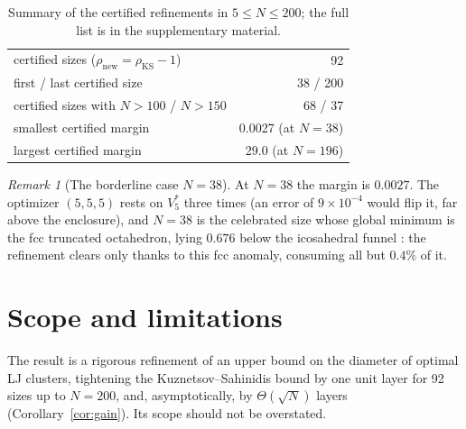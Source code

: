 \documentclass[11pt]{article}
\theoremstyle{remark}
\newtheorem{remark}{Remark}
\newcommand{\KS}{\mathrm{KS}}
\begin{document}
\begin{table}[t]
\centering
\caption{Summary of the certified refinements in $5\le N\le200$; the full list is in the supplementary material.}\label{tab:summary}
\begin{tabular}{lr}
\toprule
certified sizes ($\rho_{\mathrm{new}}=\rho_\KS-1$) & 92\\
first / last certified size & 38 / 200\\
certified sizes with $N>100$ / $N>150$ & 68 / 37\\
smallest certified margin & 0.0027 (at $N=38$)\\
largest certified margin & 29.0 (at $N=196$)\\
\bottomrule
\end{tabular}
\end{table}

\begin{remark}[The borderline case $N=38$]\label{rem:38}
At $N=38$ the margin is $0.0027$. The optimizer $(5,5,5)$ rests on $V^*_5$ three times (an error of $9\times10^{-4}$ would flip it, far above the enclosure), and $N=38$ is the celebrated size whose global minimum is the fcc truncated octahedron, lying $0.676$ below the icosahedral funnel \cite{doye1999}: the refinement clears only thanks to this fcc anomaly, consuming all but $0.4\%$ of it.
\end{remark}

\section{Scope and limitations}\label{sec:scope}

The result is a rigorous refinement of an upper bound on the diameter of optimal LJ clusters, tightening the Kuznetsov--Sahinidis bound \cite{ks2025} by one unit layer for 92 sizes up to $N=200$, and, asymptotically, by $\Theta(\sqrt N)$ layers (Corollary~\ref{cor:gain}). Its scope should not be overstated.
\end{document}
